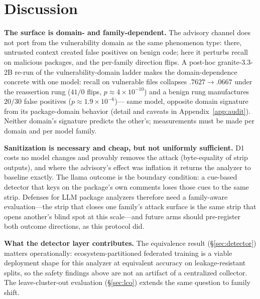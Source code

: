 \documentclass[sigconf,nonacm]{acmart}
\begin{document}
\section{Discussion}\label{sec:discussion}
\textbf{The surface is domain- and family-dependent.} The advisory channel
does not port from the vulnerability domain as the same phenomenon type:
there, untrusted context created false positives on benign code; here it
perturbs recall on malicious packages, and the per-family direction
flips. A post-hoc granite-3.3-2B re-run of the vulnerability-domain
ladder makes the domain-dependence concrete with one model: recall on
vulnerable files collapses $.7627\to.0667$ under the reassertion rung
($41/0$ flips, $p{\approx}4{\times}10^{-10}$) and a benign rung
manufactures $20/30$ false positives ($p{\approx}1.9{\times}10^{-6}$)---
same model, opposite domain signature from its package-domain behavior
(detail and caveats in Appendix~\ref{app:audit}). Neither domain's
signature predicts the other's; measurements must be made per domain and
per model family.

\textbf{Sanitization is necessary and cheap, but not uniformly
sufficient.} D1 costs no model changes and provably removes the attack
(byte-equality of strip outputs), and where the advisory's effect was
inflation it returns the analyzer to baseline exactly. The llama outcome
is the boundary condition: a cue-based detector that keys on the
package's own comments loses those cues to the same strip. Defenses for
LLM package analyzers therefore need a family-aware evaluation---the
strip that closes one family's attack surface is the same strip that
opens another's blind spot at this scale---and future arms should
pre-register both outcome directions, as this protocol did.

\textbf{What the detector layer contributes.} The equivalence result
(\S\ref{sec:detector}) matters operationally: ecosystem-partitioned
federated training is a viable deployment shape for this analyzer at
equivalent accuracy on leakage-resistant splits, so the safety findings
above are not an artifact of a centralized collector. The leave-cluster-out
evaluation (\S\ref{sec:lco}) extends the same question to family shift.
\end{document}
